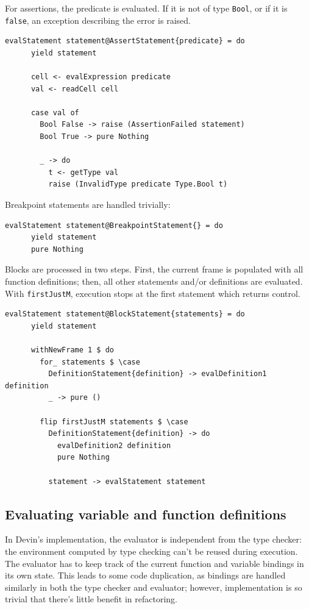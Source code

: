 \documentclass[UdineBachThesis,american,11pt]{PhdThesis}
\begin{document}
  For assertions, the predicate is evaluated. If it is not of type
  \mbox{\texttt{Bool}}, or if it is \mbox{\texttt{false}}, an exception
  describing the error is raised.

  \begin{Verbatim}[gobble=4,fontsize=\small]
    evalStatement statement@AssertStatement{predicate} = do
      yield statement

      cell <- evalExpression predicate
      val <- readCell cell

      case val of
        Bool False -> raise (AssertionFailed statement)
        Bool True -> pure Nothing

        _ -> do
          t <- getType val
          raise (InvalidType predicate Type.Bool t)
  \end{Verbatim}

  Breakpoint statements are handled trivially:

  \begin{Verbatim}[gobble=4,fontsize=\small]
    evalStatement statement@BreakpointStatement{} = do
      yield statement
      pure Nothing
  \end{Verbatim}

  Blocks are processed in two steps. First, the current frame is populated with
  all function definitions; then, all other statements and/or definitions are
  evaluated. With \mbox{\texttt{firstJustM}}, execution stops at the first
  statement which returns control.

  \begin{Verbatim}[gobble=4,fontsize=\small]
    evalStatement statement@BlockStatement{statements} = do
      yield statement

      withNewFrame 1 $ do
        for_ statements $ \case
          DefinitionStatement{definition} -> evalDefinition1 definition
          _ -> pure ()

        flip firstJustM statements $ \case
          DefinitionStatement{definition} -> do
            evalDefinition2 definition
            pure Nothing

          statement -> evalStatement statement
  \end{Verbatim}

  \subsection{Evaluating variable and function definitions}

  In Devin's implementation, the evaluator is independent from the type checker:
  the environment computed by type checking can't be reused during execution.
  The evaluator has to keep track of the current function and variable bindings
  in its own state. This leads to some code duplication, as bindings are handled
  similarly in both the type checker and evaluator; however, implementation is
  so trivial that there's little benefit in refactoring.
\end{document}
